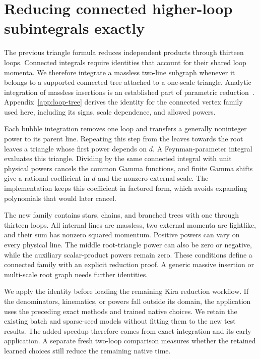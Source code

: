 \section{Reducing connected higher-loop subintegrals exactly}
\label{sec:loop-tree-method}
The previous triangle formula reduces independent products through thirteen loops. Connected integrals require identities that account for their shared loop momenta. We therefore integrate a massless two-line subgraph whenever it belongs to a supported connected tree attached to a one-scale triangle. Analytic integration of massless insertions is an established part of parametric reduction~\cite{Ruijl2017Forcer}. Appendix~\ref{app:loop-tree} derives the identity for the connected vertex family used here, including its signs, scale dependence, and allowed powers.

Each bubble integration removes one loop and transfers a generally noninteger power to its parent line. Repeating this step from the leaves towards the root leaves a triangle whose first power depends on $d$. A Feynman-parameter integral evaluates this triangle. Dividing by the same connected integral with unit physical powers cancels the common Gamma functions, and finite Gamma shifts give a rational coefficient in $d$ and the nonzero external scale. The implementation keeps this coefficient in factored form, which avoids expanding polynomials that would later cancel.

The new family contains stars, chains, and branched trees with one through thirteen loops. All internal lines are massless, two external momenta are lightlike, and their sum has nonzero squared momentum. Positive powers can vary on every physical line. The middle root-triangle power can also be zero or negative, while the auxiliary scalar-product powers remain zero. These conditions define a connected family with an explicit reduction proof. A generic massive insertion or multi-scale root graph needs further identities.

We apply the identity before loading the remaining Kira reduction workflow. If the denominators, kinematics, or powers fall outside its domain, the application uses the preceding exact methods and trained native choices. We retain the existing batch and sparse-seed models without fitting them to the new test results. The added speedup therefore comes from exact integration and its early application. A separate fresh two-loop comparison measures whether the retained learned choices still reduce the remaining native time.
